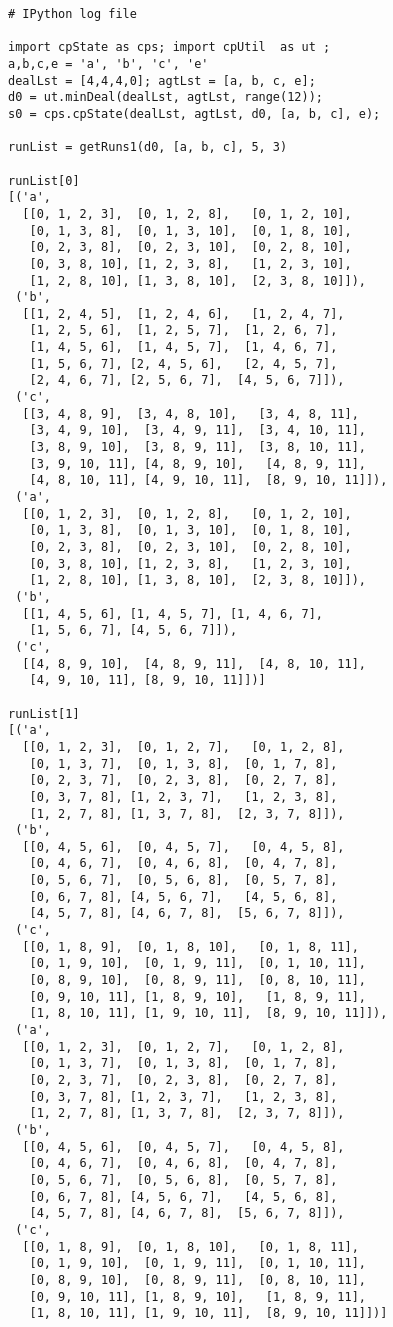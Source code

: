
\begin{verbatim}
# IPython log file

import cpState as cps; import cpUtil  as ut ;
a,b,c,e = 'a', 'b', 'c', 'e'
dealLst = [4,4,4,0]; agtLst = [a, b, c, e];
d0 = ut.minDeal(dealLst, agtLst, range(12));
s0 = cps.cpState(dealLst, agtLst, d0, [a, b, c], e);

runList = getRuns1(d0, [a, b, c], 5, 3)

runList[0]
[('a',
  [[0, 1, 2, 3],  [0, 1, 2, 8],   [0, 1, 2, 10],
   [0, 1, 3, 8],  [0, 1, 3, 10],  [0, 1, 8, 10],
   [0, 2, 3, 8],  [0, 2, 3, 10],  [0, 2, 8, 10],
   [0, 3, 8, 10], [1, 2, 3, 8],   [1, 2, 3, 10],
   [1, 2, 8, 10], [1, 3, 8, 10],  [2, 3, 8, 10]]),
 ('b',
  [[1, 2, 4, 5],  [1, 2, 4, 6],   [1, 2, 4, 7],
   [1, 2, 5, 6],  [1, 2, 5, 7],  [1, 2, 6, 7],
   [1, 4, 5, 6],  [1, 4, 5, 7],  [1, 4, 6, 7],
   [1, 5, 6, 7], [2, 4, 5, 6],   [2, 4, 5, 7],
   [2, 4, 6, 7], [2, 5, 6, 7],  [4, 5, 6, 7]]),
 ('c',
  [[3, 4, 8, 9],  [3, 4, 8, 10],   [3, 4, 8, 11],
   [3, 4, 9, 10],  [3, 4, 9, 11],  [3, 4, 10, 11],
   [3, 8, 9, 10],  [3, 8, 9, 11],  [3, 8, 10, 11],
   [3, 9, 10, 11], [4, 8, 9, 10],   [4, 8, 9, 11],
   [4, 8, 10, 11], [4, 9, 10, 11],  [8, 9, 10, 11]]),
 ('a',
  [[0, 1, 2, 3],  [0, 1, 2, 8],   [0, 1, 2, 10],
   [0, 1, 3, 8],  [0, 1, 3, 10],  [0, 1, 8, 10],
   [0, 2, 3, 8],  [0, 2, 3, 10],  [0, 2, 8, 10],
   [0, 3, 8, 10], [1, 2, 3, 8],   [1, 2, 3, 10],
   [1, 2, 8, 10], [1, 3, 8, 10],  [2, 3, 8, 10]]),
 ('b', 
  [[1, 4, 5, 6], [1, 4, 5, 7], [1, 4, 6, 7], 
   [1, 5, 6, 7], [4, 5, 6, 7]]),
 ('c',
  [[4, 8, 9, 10],  [4, 8, 9, 11],  [4, 8, 10, 11],
   [4, 9, 10, 11], [8, 9, 10, 11]])]

runList[1]
[('a',
  [[0, 1, 2, 3],  [0, 1, 2, 7],   [0, 1, 2, 8],
   [0, 1, 3, 7],  [0, 1, 3, 8],  [0, 1, 7, 8],
   [0, 2, 3, 7],  [0, 2, 3, 8],  [0, 2, 7, 8],
   [0, 3, 7, 8], [1, 2, 3, 7],   [1, 2, 3, 8],
   [1, 2, 7, 8], [1, 3, 7, 8],  [2, 3, 7, 8]]),
 ('b',
  [[0, 4, 5, 6],  [0, 4, 5, 7],   [0, 4, 5, 8],
   [0, 4, 6, 7],  [0, 4, 6, 8],  [0, 4, 7, 8],
   [0, 5, 6, 7],  [0, 5, 6, 8],  [0, 5, 7, 8],
   [0, 6, 7, 8], [4, 5, 6, 7],   [4, 5, 6, 8],
   [4, 5, 7, 8], [4, 6, 7, 8],  [5, 6, 7, 8]]),
 ('c',
  [[0, 1, 8, 9],  [0, 1, 8, 10],   [0, 1, 8, 11],
   [0, 1, 9, 10],  [0, 1, 9, 11],  [0, 1, 10, 11],
   [0, 8, 9, 10],  [0, 8, 9, 11],  [0, 8, 10, 11],
   [0, 9, 10, 11], [1, 8, 9, 10],   [1, 8, 9, 11],
   [1, 8, 10, 11], [1, 9, 10, 11],  [8, 9, 10, 11]]),
 ('a',
  [[0, 1, 2, 3],  [0, 1, 2, 7],   [0, 1, 2, 8],
   [0, 1, 3, 7],  [0, 1, 3, 8],  [0, 1, 7, 8],
   [0, 2, 3, 7],  [0, 2, 3, 8],  [0, 2, 7, 8],
   [0, 3, 7, 8], [1, 2, 3, 7],   [1, 2, 3, 8],
   [1, 2, 7, 8], [1, 3, 7, 8],  [2, 3, 7, 8]]),
 ('b',
  [[0, 4, 5, 6],  [0, 4, 5, 7],   [0, 4, 5, 8],
   [0, 4, 6, 7],  [0, 4, 6, 8],  [0, 4, 7, 8],
   [0, 5, 6, 7],  [0, 5, 6, 8],  [0, 5, 7, 8],
   [0, 6, 7, 8], [4, 5, 6, 7],   [4, 5, 6, 8],
   [4, 5, 7, 8], [4, 6, 7, 8],  [5, 6, 7, 8]]),
 ('c',
  [[0, 1, 8, 9],  [0, 1, 8, 10],   [0, 1, 8, 11],
   [0, 1, 9, 10],  [0, 1, 9, 11],  [0, 1, 10, 11],
   [0, 8, 9, 10],  [0, 8, 9, 11],  [0, 8, 10, 11],
   [0, 9, 10, 11], [1, 8, 9, 10],   [1, 8, 9, 11],
   [1, 8, 10, 11], [1, 9, 10, 11],  [8, 9, 10, 11]])]


\end{verbatim}
